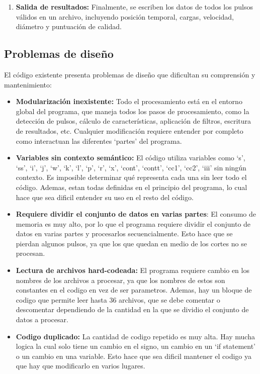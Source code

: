 \documentclass[12pt,a4paper]{article}
\begin{document}
\begin{enumerate}
\item \textbf{Salida de resultados:} Finalmente, se escriben los datos de todos los pulsos válidos
en un archivo, incluyendo posición temporal, cargas, velocidad, diámetro y puntuación de calidad.

\end{enumerate}

\subsection{Problemas de diseño}

El código existente presenta problemas de diseño que dificultan su comprensión y mantenimiento:

\begin{itemize}

\item \textbf{Modularización inexistente:} Todo el procesamiento está en el entorno global del programa, que maneja todos los pasos de procesamiento, como la detección de pulsos, cálculo de características, aplicación de filtros, escritura de resultados, etc. Cualquier modificación requiere entender por completo como interactuan las diferentes `partes' del programa.

\item \textbf{Variables sin contexto semántico:} El código utiliza variables como `s', `ss', `i', `j', `w', `k', `l', `p', `r', `x', `cont', `contt', `cc1', `cc2', `iii' sin ningún contexto. Es
imposible determinar qué representa cada una sin leer todo el código. Ademas, estan todas definidas en el principio del programa, lo cual hace que sea dificil entender su uso en el resto del código.
    
\item \textbf{Requiere dividir el conjunto de datos en varias partes}: El consumo de memoria es muy alto, por lo que el programa requiere dividir el conjunto de datos en varias partes y procesarlos secuencialmente. Esto hace que se pierdan algunos pulsos, ya que los que quedan en medio de los cortes no se procesan.

\item \textbf{Lectura de archivos hard-codeada:} El programa requiere cambio en los nombres de los archivos a procesar, ya que los nombres de estos son constantes en el codigo en vez de ser parametros. Ademas, hay un bloque de codigo que permite leer hasta 36 archivos, que se debe comentar o descomentar dependiendo de la cantidad en la que se dividio el conjunto de datos a procesar.

\item \textbf{Codigo duplicado:} La cantidad de codigo repetido es muy alta. Hay mucha logica la cual solo tiene un cambio en el signo, un cambio en un `if statement' o un cambio en una variable. Esto hace que sea dificil mantener el codigo ya que hay que modificarlo en varios lugares.

\end{itemize}
\end{document}
